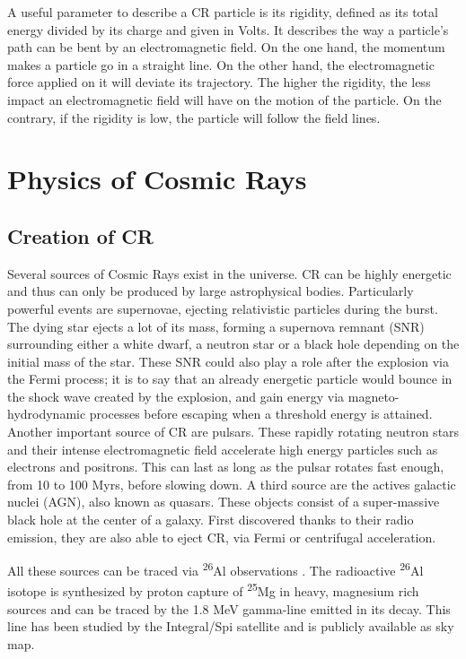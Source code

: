 A useful parameter to describe a CR particle is its rigidity, defined as its total energy divided by its charge and given in Volts. It describes the way a particle's path can be bent by an electromagnetic field. On the one hand, the momentum makes a particle go in a straight line. On the other hand, the electromagnetic force applied on it will deviate its trajectory. The higher the rigidity, the less impact an electromagnetic field will have on the motion of the particle. On the contrary, if the rigidity is low, the particle will follow the field lines.

\newpage
\section{Physics of Cosmic Rays}

\subsection{Creation of CR}
\label{sec:creation_of_CRs}

Several sources of Cosmic Rays exist in the universe. CR can be highly energetic and thus can only be produced by large astrophysical bodies. Particularly powerful events are supernovae, ejecting relativistic particles during the burst. The dying star ejects a lot of its mass, forming a supernova remnant (SNR) surrounding either a white dwarf, a neutron star or a black hole depending on the initial mass of the star. These SNR could also play a role after the explosion via the Fermi process; it is to say that an already energetic particle would bounce in the shock wave created by the explosion, and gain energy via magneto-hydrodynamic processes before escaping when a threshold energy is attained. \cite{Wu1984}
Another important source of CR are pulsars. These rapidly rotating neutron stars and their intense electromagnetic field accelerate high energy particles such as electrons and positrons. This can last as long as the pulsar rotates fast enough, from 10 to 100 Myrs, before slowing down.
A third source are the actives galactic nuclei (AGN), also known as quasars. These objects consist of a super-massive black hole at the center of a galaxy. First discovered thanks to their radio emission, they are also able to eject CR, via Fermi or centrifugal acceleration.

All these sources can be traced via \textsuperscript{26}Al observations  \cite{Prantzos1996}. The radioactive \textsuperscript{26}Al isotope is synthesized by proton capture of \textsuperscript{25}Mg in heavy, magnesium rich sources and can be traced by the 1.8 MeV gamma-line emitted in its decay.  This line has been studied by the Integral/Spi satellite \cite{Bouchet2015}  and is publicly available as sky map. \cite{Almap}


